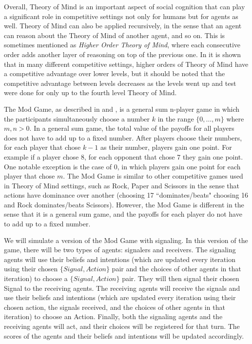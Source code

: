 Overall, Theory of Mind is an important aspect of social cognition that can play a significant role in competitive settings not only for humans but for agents as well. Theory of Mind can also be applied recursively, in the sense that an agent can reason about the Theory of Mind of another agent, and so on. This is sometimes mentioned as \textit{Higher Order Theory of Mind}, where each consecutive order adds another layer of reasoning on top of the previous one. In \cite{de2013much} it is shown that in many different competitive settings, higher orders of Theory of Mind have a competitive advantage over lower levels, but it should be noted that the competitive advantage between levels decreases as the levels went up and test were done for only up to the fourth level Theory of Mind.

The Mod Game, as described in \cite{frey2013cyclic} and \cite{veltman2019training}, is a general sum n-player game in which the participants simultaneously choose a number $k$ in the range $\{0, …, m\}$ where $m, n > 0$. In a general sum game, the total value of the payoffs for all players does not have to add up to a fixed number. After players choose their numbers, for each player that chose $k - 1$ as their number, players gain one point. For example if a player chose 8, for each opponent that chose 7 they gain one point. One notable exception is the case of 0, in which players gain one point for each player that chose $m$. The Mod Game is similar to other competitive games used in Theory of Mind settings, such as Rock, Paper and Scissors in the sense that actions have dominance over another (choosing 17 ``dominates/beats" choosing 16 and Rock dominates/beats Scissors). However, the Mod Game is different in the sense that it is a general sum game, and the payoffs for each player do not have to add up to a fixed number.

We will simulate a version of the Mod Game with signaling. In this version of the game, there will be two types of agents: signalers and receivers. The signaling agents will use their beliefs and intentions (which are updated every iteration using their chosen $\{Signal, Action\}$ pair and the choices of other agents in that iteration) to choose a $\{Signal, Action\}$ pair. They will then signal their chosen Signal to the receiving agents. The receiving agents will receive the signals and use their beliefs and intentions (which are updated every iteration using their chosen action, the signals received, and the choices of other agents in that iteration) to choose an Action. Finally, both the signaling agents and the receiving agents will act, and their choices will be registered for that turn. The scores of the agents and their beliefs and intentions will be updated accordingly.

